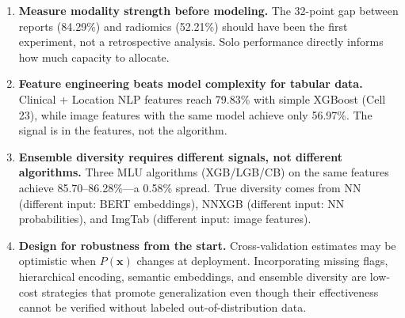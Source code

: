 \begin{enumerate}
  \item \textbf{Measure modality strength before modeling.} The 32-point gap between reports (84.29\%) and radiomics (52.21\%) should have been the first experiment, not a retrospective analysis. Solo performance directly informs how much capacity to allocate.
  \item \textbf{Feature engineering beats model complexity for tabular data.} Clinical + Location NLP features reach 79.83\% with simple XGBoost (Cell 23), while image features with the same model achieve only 56.97\%. The signal is in the features, not the algorithm.
  \item \textbf{Ensemble diversity requires different signals, not different algorithms.} Three MLU algorithms (XGB/LGB/CB) on the same features achieve 85.70--86.28\%---a 0.58\% spread. True diversity comes from NN (different input: BERT embeddings), NNXGB (different input: NN probabilities), and ImgTab (different input: image features).
  \item \textbf{Design for robustness from the start.} Cross-validation estimates may be optimistic when $P(\mathbf{x})$ changes at deployment. Incorporating missing flags, hierarchical encoding, semantic embeddings, and ensemble diversity are low-cost strategies that promote generalization even though their effectiveness cannot be verified without labeled out-of-distribution data.
\end{enumerate}
